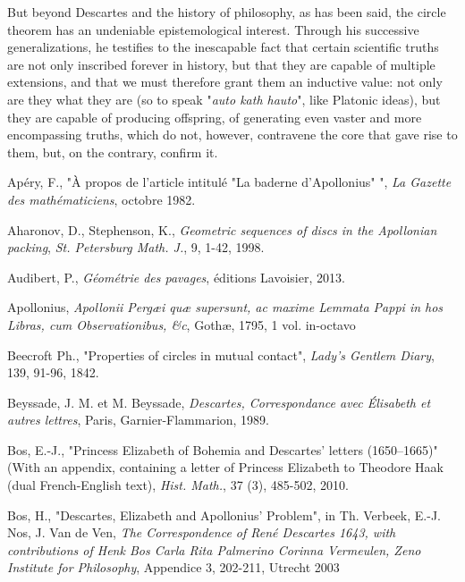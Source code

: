 \documentclass[12pt]{article}
\theoremstyle{définition}
\theoremstyle{remark}
\theoremstyle{plain}
\theoremstyle{plain}
\begin{document}
But beyond Descartes and the history of philosophy, as has been said, the circle theorem has an undeniable epistemological interest. Through his successive generalizations, he testifies to the inescapable fact that certain scientific truths are not only inscribed forever in history, but that they are capable of multiple extensions, and that we must therefore grant them an inductive value: not only are they what they are (so to speak "{\it auto kath hauto}", like Platonic ideas), but they are capable of producing offspring, of generating even vaster and more encompassing truths, which do not, however, contravene the core that gave rise to them, but, on the contrary, confirm it.

\begin{thebibliography}{}

 Apéry, F., "À propos de l'article intitulé "La baderne d'Apollonius" ", {\it La Gazette des mathématiciens}, octobre 1982.

 Aharonov, D., Stephenson, K., {\it Geometric sequences of discs in the Apollonian packing}, {\it St. Petersburg Math. J.}, 9, 1-42, 1998.

 Audibert, P., {\it Géométrie des pavages},  éditions Lavoisier, 2013. 

 Apollonius, {\it Apollonii Pergæi quæ supersunt, ac maxime Lemmata Pappi in hos Libras, cum Observationibus, \&c}, Gothæ, 1795, 1 vol. in-octavo

 Beecroft Ph., "Properties of circles in mutual contact", {\it Lady’s Gentlem Diary}, 139, 91-96, 1842.

 Beyssade, J. M. et M. Beyssade, {\it Descartes, Correspondance avec \'{E}lisabeth et autres lettres}, Paris, Garnier-Flammarion, 1989.

 Bos, E.-J., "Princess Elizabeth of Bohemia and Descartes’ letters (1650–1665)" (With an appendix, containing a
letter of Princess Elizabeth to Theodore Haak (dual French-English text), {\it Hist. Math.}, 37 (3), 485-502, 2010.

 Bos, H., "Descartes, Elizabeth and Apollonius’ Problem", in Th. Verbeek, E.-J. Nos, J. Van de Ven, {\it The Correspondence of René Descartes 1643, with contributions of Henk Bos Carla Rita Palmerino Corinna Vermeulen, Zeno Institute for Philosophy}, Appendice 3, 202-211, Utrecht 2003 


\end{thebibliography}
\end{document}
